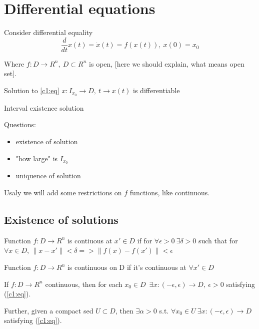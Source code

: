 \section{Differential equations}

Consider differential equality
\begin{equation}\label{c1:eq}
\frac{d}{dt}x(t)=\dot x(t)=f(x(t)), \ x(0)=x_0 
\end{equation}

Where $f:D\rightarrow R^n, \ D\subset R^n$ is open, [here we should explain,
what means open set].

Solution to \ref{c1:eq} $x:I_{x_0} \rightarrow D, \ t\rightarrow x(t)$ is
differentiable

Interval existence solution

Questions:

\begin{itemize}[label=$\#$]
\item existence of solution
\item "how large" is $I_{x_0}$
\item uniquence of solution
\end{itemize}



Usaly we will add some restrictions on $f$ functions, like continuous.

\subsection{Existence of solutions}

Function $f:D \rightarrow R^n$ is contiuous at $x' \in D$ if for
$\forall \epsilon > 0 \ \exists \delta>0$ such that for $\forall x \in D$,
$\|x-x'\|<\delta => \|f(x)-f(x')\| < \epsilon$

Function $f:D \rightarrow R^n$ is continuous on D if it's 
continuous at $\forall x' \in D$

If $f:D \rightarrow R^n$ continuous, then for each $x_0 \in D$\ 
$\exists x:(-\epsilon,\epsilon) \rightarrow D, \ \epsilon > 0$
satisfying (\ref{c1:eq}).

Further, given a compact sed $U \subset D$, then 
$\exists \alpha > 0$ s.t. $\forall x_0 \in U 
\ \exists x:(-\epsilon,\epsilon) \rightarrow D$ satisfying (\ref{c1:eq}).


